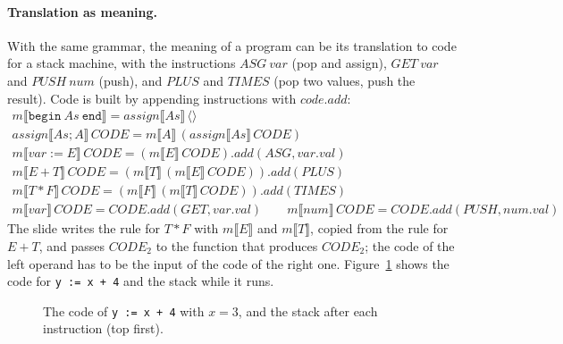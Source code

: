 \paragraph{Translation as meaning.} With the same grammar, the meaning of a
program can be its translation to code for a stack machine, with the
instructions $\mathit{ASG}\ \mathit{var}$ (pop and assign), $\mathit{GET}\ \mathit{var}$ and
$\mathit{PUSH}\ \mathit{num}$ (push), and $\mathit{PLUS}$ and $\mathit{TIMES}$ (pop two values,
push the result). Code is built by appending instructions with
$\mathit{code.add}$:
\[
\begin{array}{l}
m\llbracket \mathtt{begin}\ As\ \mathtt{end} \rrbracket = \mathit{assign}\llbracket As \rrbracket\, \langle\rangle \\
\mathit{assign}\llbracket As ; A \rrbracket\, \mathit{CODE} = m\llbracket A \rrbracket\, (\mathit{assign}\llbracket As \rrbracket\, \mathit{CODE}) \\
m\llbracket \mathit{var} := E \rrbracket\, \mathit{CODE} = (m\llbracket E \rrbracket\, \mathit{CODE}).\mathit{add}(\mathit{ASG}, \mathit{var.val}) \\
m\llbracket E + T \rrbracket\, \mathit{CODE} = (m\llbracket T \rrbracket\, (m\llbracket E \rrbracket\, \mathit{CODE})).\mathit{add}(\mathit{PLUS}) \\
m\llbracket T * F \rrbracket\, \mathit{CODE} = (m\llbracket F \rrbracket\, (m\llbracket T \rrbracket\, \mathit{CODE})).\mathit{add}(\mathit{TIMES}) \\
m\llbracket \mathit{var} \rrbracket\, \mathit{CODE} = \mathit{CODE}.\mathit{add}(\mathit{GET}, \mathit{var.val}) \qquad
m\llbracket \mathit{num} \rrbracket\, \mathit{CODE} = \mathit{CODE}.\mathit{add}(\mathit{PUSH}, \mathit{num.val})
\end{array}
\]
The slide writes the rule for $T * F$ with $m\llbracket E \rrbracket$ and
$m\llbracket T \rrbracket$, copied from the rule for $E + T$, and passes
$\mathit{CODE}_2$ to the function that produces $\mathit{CODE}_2$; the code of the left
operand has to be the input of the code of the right one. Figure~\ref{fig:stack-code}
shows the code for \texttt{y := x + 4} and the stack while it runs.

\begin{figure}[h]
\centering
{}
\caption{The code of \texttt{y := x + 4} with $x = 3$, and the stack after each instruction (top first).}
\label{fig:stack-code}
\end{figure}

